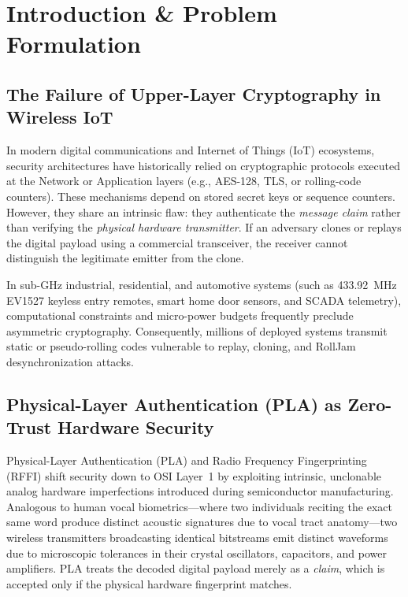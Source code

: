 \documentclass[11pt,a4paper]{article}
\begin{document}
\section{Introduction \& Problem Formulation}
\subsection{The Failure of Upper-Layer Cryptography in Wireless IoT}
In modern digital communications and Internet of Things (IoT) ecosystems, security architectures have historically relied on cryptographic protocols executed at the Network or Application layers (e.g., AES-128, TLS, or rolling-code counters). These mechanisms depend on stored secret keys or sequence counters. However, they share an intrinsic flaw: they authenticate the \textit{message claim} rather than verifying the \textit{physical hardware transmitter}. If an adversary clones or replays the digital payload using a commercial transceiver, the receiver cannot distinguish the legitimate emitter from the clone. 

In sub-GHz industrial, residential, and automotive systems (such as 433.92~MHz EV1527 keyless entry remotes, smart home door sensors, and SCADA telemetry), computational constraints and micro-power budgets frequently preclude asymmetric cryptography. Consequently, millions of deployed systems transmit static or pseudo-rolling codes vulnerable to replay, cloning, and RollJam desynchronization attacks.

\subsection{Physical-Layer Authentication (PLA) as Zero-Trust Hardware Security}
Physical-Layer Authentication (PLA) and Radio Frequency Fingerprinting (RFFI) shift security down to OSI Layer~1 by exploiting intrinsic, unclonable analog hardware imperfections introduced during semiconductor manufacturing. Analogous to human vocal biometrics—where two individuals reciting the exact same word produce distinct acoustic signatures due to vocal tract anatomy—two wireless transmitters broadcasting identical bitstreams emit distinct waveforms due to microscopic tolerances in their crystal oscillators, capacitors, and power amplifiers. PLA treats the decoded digital payload merely as a \textit{claim}, which is accepted only if the physical hardware fingerprint matches.
\end{document}
